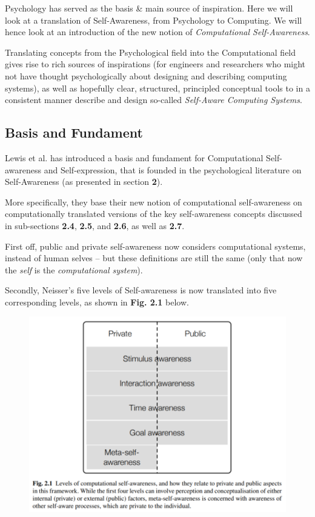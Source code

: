 \documentclass{article}
\begin{document}
Psychology has served as the basis \& main source of inspiration. Here we will look at a translation of Self-Awareness, from Psychology to Computing. We will hence look at an introduction of the new notion of \textit{Computational Self-Awareness}.

Translating concepts from the Psychological field into the Computational field gives rise to rich sources of inspirations (for engineers and researchers who might not have thought psychologically about designing and describing computing systems), as well as hopefully clear, structured, principled conceptual tools to in a consistent manner describe and design so-called \textit{Self-Aware Computing Systems}.

\subsection{Basis and Fundament}

Lewis et al. \cite{sacs16_ch2} has introduced a basis and fundament for Computational Self-awareness and Self-expression, that is founded in the psychological literature on Self-Awareness (as presented in section \textbf{2}).

More specifically, they base their new notion of computational self-awareness on computationally translated versions of the key self-awareness concepts discussed in sub-sections \textbf{2.4}, \textbf{2.5}, and \textbf{2.6}, as well as \textbf{2.7}.

First off, public and private self-awareness now considers computational systems, instead of human selves -- but these definitions are still the same (only that now the \textit{self} is the \textit{computational system}).

Secondly, Neisser's five levels of Self-awareness is now translated into five corresponding levels, as shown in \textbf{Fig. 2.1} below.

\begin{figure}[!htp]
\centering
\includegraphics[width=0.7\columnwidth]{Assets/pics/self_awareness_levels.PNG}
\end{figure}
\end{document}
